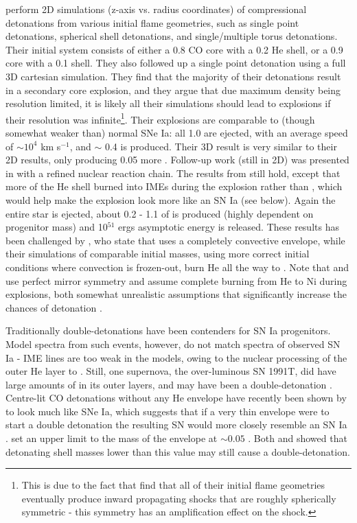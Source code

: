 \cite{finkhr07} perform 2D simulations (z-axis vs. radius coordinates) of compressional detonations from various initial flame geometries, such as single point detonations, spherical shell detonations, and single/multiple torus detonations.  Their initial system consists of either a 0.8 {\Msun} CO core with a 0.2 {\Msun} He shell, or a  0.9 {\Msun} core with a 0.1 {\Msun} shell.  They also followed up a single point detonation using a full 3D cartesian simulation.  They find that the majority of their detonations result in a secondary core explosion, and they argue that due maximum density being resolution limited, it is likely all their simulations should lead to explosions if their resolution was infinite\footnote{This is due to the fact that \citeauthor{finkhr07} find that all of their initial flame geometries eventually produce inward propagating shocks that are roughly spherically symmetric - this symmetry has an amplification effect on the shock.}.  Their explosions are comparable to (though somewhat weaker than) normal SNe Ia: all 1.0 {\Msun} are ejected, with an average speed of $\sim 10^4$ km s$^{-1}$, and $\sim$ 0.4 {\Msun} {\Ni} is produced.  Their 3D result is very similar to their 2D results, only producing 0.05 {\Msun} more {\Ni}.  Follow-up work (still in 2D) was presented in \cite{fink+10} with a refined nuclear reaction chain.  The results from \cite{finkhr07} still hold, except that more of the He shell burned into IMEs during the explosion rather than {\Ni}, which would help make the explosion look more like an SN Ia (see below).  Again the entire star is ejected, about 0.2 - 1.1 {\Msun} of {\Ni} is produced (highly dependent on progenitor mass) and 10$^{51}$ ergs asymptotic energy is released.  These results has been challenged by \citeauthor{woosk10}, who state that \citeauthor{fink+10} uses a completely convective envelope, while their simulations of comparable initial masses, using more correct initial conditions where convection is frozen-out, burn He all the way to {\Ni}.  Note that \cite{finkhr07} and \cite{fink+10} use perfect mirror symmetry and assume complete burning from He to Ni during explosions, both somewhat unrealistic assumptions that significantly increase the chances of detonation \citep{guil+10}.

Traditionally double-detonations have been contenders for SN Ia progenitors.  Model spectra from such events, however, do not match spectra of observed SN Ia - IME lines are too weak in the models, owing to the nuclear processing of the outer He layer to {\Ni} \citep{woosk10,finkhr07,vkercj10,howe10}.  Still, one supernova, the over-luminous SN 1991T, did have large amounts of {\Ni} in its outer layers, and may have been a double-detonation \citep{finkhr07}.  Centre-lit CO detonations without any He envelope have recently been shown by \cite{sim+10} to look much like SNe Ia, which suggests that if a very thin envelope were to start a double detonation the resulting SN would more closely resemble an SN Ia \citep{howe10}. \citeauthor{woosk10} set an upper limit to the mass of the envelope at $\sim 0.05$ {\Msun}.  Both \citeauthor{woosk10} and \citeauthor{fink+10} showed that detonating shell masses lower than this value may still cause a double-detonation.

